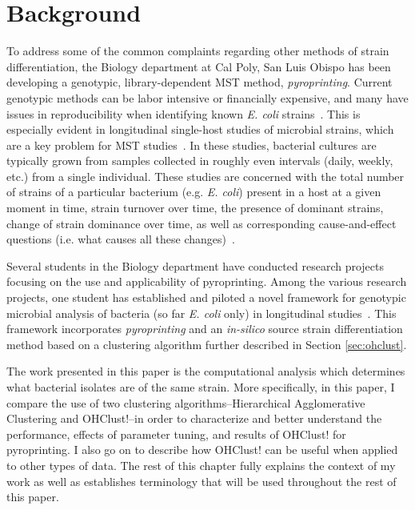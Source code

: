\documentclass[12pt]{ucthesis}
\begin{document}
\chapter{Background}\label{chap:background}
   To address some of the common complaints regarding other methods of strain
   differentiation, the Biology department at Cal Poly, San Luis Obispo has
   been developing a genotypic, library-dependent MST method,
   \textit{pyroprinting}. Current genotypic methods can be labor intensive or
   financially expensive, and many have issues in reproducibility when
   identifying known \textit{E. coli} strains~\cite{Gordon:StrainTyping,
   Scott:CurrentMST, Simpson:StateOf}. This is especially evident in
   longitudinal single-host studies of microbial strains, which are a key
   problem for MST studies~\cite{Simpson:StateOf, Anderson:Diversity,
   Schlager:Clonal}. In these studies, bacterial cultures are typically grown
   from samples collected in roughly even intervals (daily, weekly, etc.) from
   a single individual. These studies are concerned with the total number of
   strains of a particular bacterium (e.g. \textit{E. coli}) present in a host
   at a given moment in time, strain turnover over time, the presence of
   dominant strains, change of strain dominance over time, as well as
   corresponding cause-and-effect questions (i.e. what causes all these
   changes)~\cite{Anderson:Diversity, Caugant:Diverse, Sears:Persist,
   Simpson:StateOf}.
   
   Several students in the Biology department have conducted research projects
   focusing on the use and applicability of pyroprinting.  Among the various
   research projects, one student has established and piloted a novel framework
   for genotypic microbial analysis of bacteria (so far \textit{E. coli} only)
   in longitudinal studies~\cite{Montana:ChronoCluster, Montana:CRC}. This
   framework incorporates \textit{pyroprinting} and an \textit{in-silico}
   source strain differentiation method based on a clustering algorithm further
   described in Section \ref{sec:ohclust}.
   
   The work presented in this paper is the computational analysis which
   determines what bacterial isolates are of the same strain. More
   specifically, in this paper, I compare the use of two clustering
   algorithms--Hierarchical Agglomerative Clustering and OHClust!--in order to
   characterize and better understand the performance, effects of parameter tuning,
   and results of OHClust! for pyroprinting. I also go on to describe how
   OHClust! can be useful when applied to other types of data. The rest of this
   chapter fully explains the context of my work as well as establishes
   terminology that will be used throughout the rest of this paper.
\end{document}
